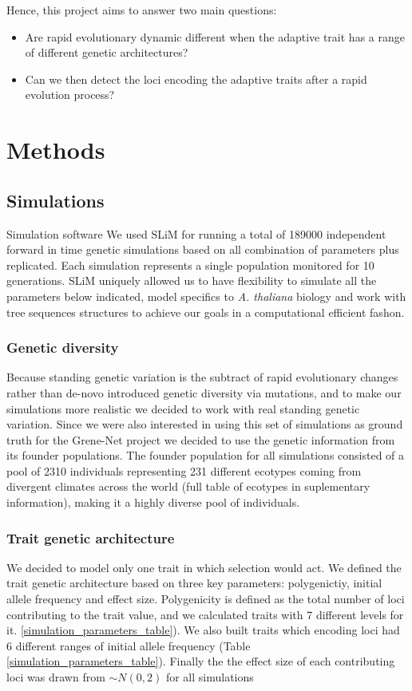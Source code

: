 \documentclass{article}
\begin{document}
Hence, this project aims to answer two main questions: 
\begin{itemize}
    \item Are rapid evolutionary dynamic different when the adaptive trait has a range of different genetic architectures? 
    \item Can we then detect the loci encoding the adaptive traits after a rapid evolution process?
\end{itemize}

\section{Methods}
\subsection{Simulations}

Simulation software
We used SLiM \citep{Haller2019-oj} for running a total of 189000 independent forward in time genetic simulations based on all combination of parameters plus replicated.  Each simulation represents a single population monitored for 10 generations. SLiM uniquely allowed us to have flexibility to simulate all the parameters below indicated, model specifics to \textit{A. thaliana} biology and work with tree sequences structures to achieve our goals in a computational efficient fashon. 

\subsubsection{Genetic diversity}
Because standing genetic variation is the subtract of rapid evolutionary changes rather than de-novo introduced genetic diversity via mutations, and to make our simulations more realistic we decided to work with real standing genetic variation. Since we were also interested in using this set of simulations as ground truth for the Grene-Net project we decided to use the genetic information from its founder populations. The founder population for all simulations consisted of a pool of 2310 individuals representing 231 different ecotypes coming from divergent climates across the world (full table of ecotypes in suplementary information), making it a highly diverse pool of individuals. 

\subsubsection{Trait genetic architecture}
We decided to model only one trait in which selection would act. We defined the trait genetic architecture based on three key parameters: polygenictiy, initial allele frequency and effect size. Polygenicity is defined as the total number of loci contributing to the trait value, and we calculated traits with 7 different levels for it. \ref{simulation_parameters_table}). We also built traits which encoding loci had 6 different ranges of initial allele frequency (Table \ref{simulation_parameters_table}). Finally the the effect size of each contributing loci was drawn from \( \sim N(0, 2) \) for all simulations
\end{document}
